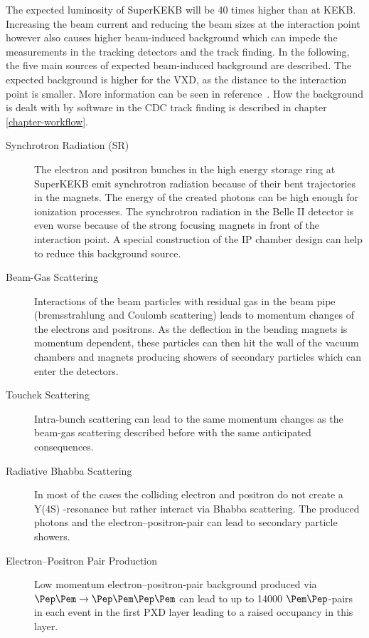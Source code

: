 The expected luminosity of SuperKEKB will be 40 times higher than at KEKB. Increasing the beam current and reducing the beam sizes at the interaction point however also causes higher beam-induced background which can impede the measurements in the tracking detectors and the track finding. In the following, the five main sources of expected beam-induced background are described. The expected background is higher for the VXD, as the distance to the interaction point is smaller. More information can be seen in reference~\cite{jakob}. How the background is dealt with by software in the CDC track finding is described in chapter \ref{chapter-workflow}.

\begin{description}
 \item[Synchrotron Radiation (SR)] The electron and positron bunches in the high energy storage ring at SuperKEKB emit synchrotron radiation because of their bent trajectories in the magnets. The energy of the created photons can be high enough for ionization processes. The synchrotron radiation in the Belle II detector is even worse because of the strong focusing magnets in front of the interaction point. A special construction of the IP chamber design can help to reduce this background source.
 \item[Beam-Gas Scattering] Interactions of the beam particles with residual gas in the beam pipe (bremsstrahlung and Coulomb scattering) leads to momentum changes of the electrons and positrons. As the deflection in the bending magnets is momentum dependent, these particles can then hit the wall of the vacuum chambers and magnets producing showers of secondary particles which can enter the detectors.
 \item[Touchek Scattering] Intra-bunch scattering can lead to the same momentum changes as the beam-gas scattering described before with the same anticipated consequences.
 \item[Radiative Bhabba Scattering] In most of the cases the colliding electron and positron do not create a Y(4S) -resonance but rather interact via Bhabba scattering. The produced photons and the electron--positron-pair can lead to secondary particle showers.
 \item[Electron--Positron Pair Production] Low momentum electron--positron-pair background produced via $\Pep \Pem \to \Pep \Pem \Pep \Pem$ can lead to up to 14000 $\Pem\Pep$-pairs in each event in the first PXD layer leading to a raised occupancy in this layer.
\end{description}
